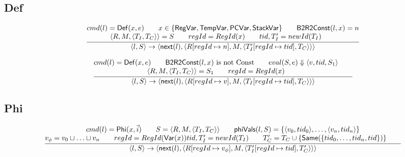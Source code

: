 \documentclass{article}
\newcommand{\step}[4]{\langle #1,#2\rangle \rightarrow \langle #3,#4\rangle}
\newcommand{\nexti}{\mathsf{next}}
\newcommand{\eval}[3]{eval(#1,#2) \Downarrow #3}
\newcommand{\join}{\sqcup}
\newcommand{\bconst}{\mathsf{B2R2Const}}
\begin{document}
\subsection{Def}
\[
\frac{
    \begin{array}{@{}c@{}}
        cmd(l)=\mathsf{Def}(x,e) \qquad
        x\in\{\mathsf{RegVar},\mathsf{TempVar},\mathsf{PCVar},\mathsf{StackVar}\} \qquad
        \bconst(l,x)=n\\
        
        \langle R,M,\langle T_I,T_C\rangle\rangle = S \qquad
        regId=RegId(x)\qquad
        tid,T_I'=newId(T_I)\qquad

    \end{array}
} {
    \step{l}{S}{\nexti(l)}
    {
    \left\langle
      R[regId \mapsto n],M,
      \left\langle T_I'[regId \mapsto tid], T_C \right\rangle
    \right\rangle
    }
}
\]

\[
\frac{
    \begin{array}{@{}c@{}}
        cmd(l)=\mathsf{Def}(x,e) \qquad
        \bconst(l,x) \text{ is not Const} \qquad
        \eval{S}{e}{\langle v,tid,S_1 \rangle} \qquad\\
    
        \langle R,M,\langle T_I,T_C \rangle \rangle = S_1 \qquad
        regId=RegId(x)\qquad
    \end{array}
} {
    \step{l}{S}{\nexti(l)}
    {
        \left\langle
          R[regId \mapsto v],M,
          \left\langle T_I[regId \mapsto tid], T_C \right\rangle
        \right\rangle
    }
}
\]

\subsection{Phi}
\[
\frac{
    \begin{array}{@{}c@{}}
        cmd(l)=\mathsf{Phi}(x,\vec{i}) \qquad
        S=\langle R,M,\langle T_I,T_C\rangle\rangle \qquad
        \mathsf{phiVals}(l,S)=\{\langle v_0, tid_0\rangle,\ldots,\langle v_n, tid_n\rangle\}\\

        v_\phi = v_0 \join \ldots \join v_n\qquad
        regId=RegId(\mathsf{Var}(x))

        tid, T_I'=newId(T_I)\qquad
        T_C'=T_C \cup \{ \mathsf{Same}(\{tid_0, \ldots, tid_n, tid\}) \}\qquad
    \end{array}
} {
    \step{l}{S}{\nexti(l)}
    {
    \left\langle
      R[regId \mapsto v_\phi],M,\langle T_I'[regId \mapsto tid], T_C' \rangle
    \right\rangle
    }
}
\]
\end{document}
